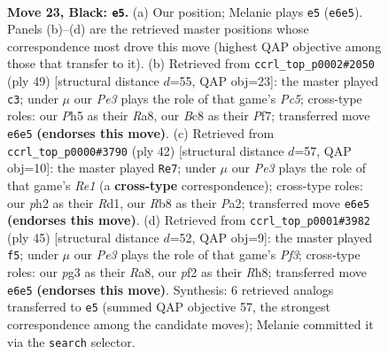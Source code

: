 \documentclass[11pt]{article}
\begin{document}
\clearpage

\begin{figure}[p]\centering
\begin{subfigure}{0.46\textwidth}\centering
\resizebox{\linewidth}{!}{%
\newchessgame
\chessboard[
  setfen={1rb2r2/p1pp1pk1/2n1p3/2R4p/8/5PP1/PP1B1P1P/4KB1R b - - 0 23},
  showmover=false,
  pgfstyle=straightmove, color=movearrow, markmove={e6-e5}
]}
\caption{}
\end{subfigure}\hfill
\begin{subfigure}{0.46\textwidth}\centering
\resizebox{\linewidth}{!}{%
\newchessgame
\chessboard[
  setfen={r4k2/1r3pp1/1p5p/2nR4/2p5/P3P3/1P2BPPP/4K2R b K - 0 25},
  showmover=false,
  pgfstyle=straightmove, color=movearrow, markmove={c4-c3}
]}
\caption{}
\end{subfigure}
\\[4pt]
\begin{subfigure}{0.46\textwidth}\centering
\resizebox{\linewidth}{!}{%
\newchessgame
\chessboard[
  setfen={r1b3k1/1pp3bp/p2p4/3P4/2P2rP1/2NB4/PP5P/2KRR3 w - - 0 22},
  showmover=false,
  pgfstyle=straightmove, color=movearrow, markmove={e1-e7}
]}
\caption{}
\end{subfigure}\hfill
\begin{subfigure}{0.46\textwidth}\centering
\resizebox{\linewidth}{!}{%
\newchessgame
\chessboard[
  setfen={r1b1k2r/3pnp2/4pp2/7p/5P2/B7/1PP3PP/2KR1B1R b kq - 1 23},
  showmover=false,
  pgfstyle=straightmove, color=movearrow, markmove={f6-f5}
]}
\caption{}
\end{subfigure}
\caption{\textbf{Move 23, Black: \texttt{e5}.} (a) Our position; Melanie plays \texttt{e5} (\texttt{e6e5}). Panels (b)--(d) are the retrieved master positions whose correspondence most drove this move (highest QAP objective among those that transfer to it). (b) Retrieved from \texttt{ccrl\_top\_p0002\#2050} (ply 49) [structural distance $d$=55, QAP obj=23]: the master played \texttt{c3}; under $\mu$ our \emph{Pe3} plays the role of that game's \emph{Pc5}; cross-type roles: our \emph{P}h5 as their \emph{R}a8, our \emph{B}c8 as their \emph{P}f7; transferred move \texttt{e6e5} \textbf{(endorses this move)}. (c) Retrieved from \texttt{ccrl\_top\_p0000\#3790} (ply 42) [structural distance $d$=57, QAP obj=10]: the master played \texttt{Re7}; under $\mu$ our \emph{Pe3} plays the role of that game's \emph{Re1} (a \textbf{cross-type} correspondence); cross-type roles: our \emph{p}h2 as their \emph{R}d1, our \emph{R}b8 as their \emph{P}a2; transferred move \texttt{e6e5} \textbf{(endorses this move)}. (d) Retrieved from \texttt{ccrl\_top\_p0001\#3982} (ply 45) [structural distance $d$=52, QAP obj=9]: the master played \texttt{f5}; under $\mu$ our \emph{Pe3} plays the role of that game's \emph{Pf3}; cross-type roles: our \emph{p}g3 as their \emph{R}a8, our \emph{p}f2 as their \emph{R}h8; transferred move \texttt{e6e5} \textbf{(endorses this move)}. Synthesis: 6 retrieved analogs transferred to \texttt{e5} (summed QAP objective 57, the strongest correspondence among the candidate moves); Melanie committed it via the \texttt{search} selector.}
\label{fig:thought-m45}
\end{figure}
\end{document}
